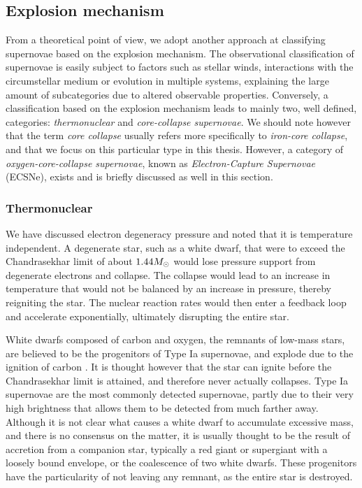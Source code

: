\subsection{Explosion mechanism} \label{sec:sne_exp}

From a theoretical point of view, we adopt another approach at classifying supernovae based on the explosion mechanism. The observational classification of supernovae is easily subject to factors such as stellar winds, interactions with the circumstellar medium or evolution in multiple systems, explaining the large amount of subcategories due to altered observable properties. Conversely, a classification based on the explosion mechanism leads to mainly two, well defined, categories: \emph{thermonuclear} and \emph{core-collapse supernovae}. We should note however that the term \emph{core collapse} usually refers more specifically to \emph{iron-core collapse}, and that we focus on this particular type in this thesis. However, a category of \emph{oxygen-core-collapse supernovae}, known as \emph{Electron-Capture Supernovae} (ECSNe), exists and is briefly discussed as well in this section.

\subsubsection{Thermonuclear} \label{sec:sne_exp_ia}

We have discussed electron degeneracy pressure and noted that it is temperature independent. A degenerate star, such as a white dwarf, that were to exceed the Chandrasekhar limit of about \(1.44M_{\odot}\) would lose pressure support from degenerate electrons and collapse. The collapse would lead to an increase in temperature that would not be balanced by an increase in pressure, thereby reigniting the star. The nuclear reaction rates would then enter a feedback loop and accelerate exponentially, ultimately disrupting the entire star.

White dwarfs composed of carbon and oxygen, the remnants of low-mass stars, are believed to be the progenitors of Type Ia supernovae, and explode due to the ignition of carbon \citep{Mazzali2007}. It is thought however that the star can ignite before the Chandrasekhar limit is attained, and therefore never actually collapses. Type Ia supernovae are the most commonly detected supernovae, partly due to their very high brightness that allows them to be detected from much farther away. Although it is not clear what causes a white dwarf to accumulate excessive mass, and there is no consensus on the matter, it is usually thought to be the result of accretion from a companion star, typically a red giant or supergiant with a loosely bound envelope, or the coalescence of two white dwarfs.
These progenitors have the particularity of not leaving any remnant, as the entire star is destroyed.


